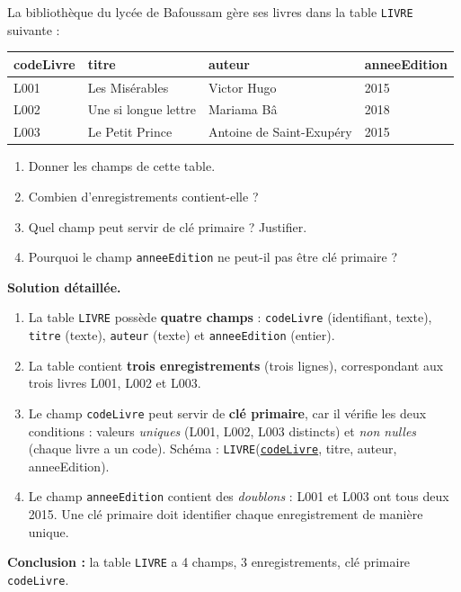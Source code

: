 \documentclass[11pt]{article}
\begin{document}
\begin{exoresolu}
La bibliothèque du lycée de Bafoussam gère ses livres dans la table \texttt{LIVRE} suivante :

\begin{center}
\begin{tabularx}{\linewidth}{|l|X|l|l|}
\hline
\rowcolor{popblueL} \textbf{codeLivre} & \textbf{titre} & \textbf{auteur} & \textbf{anneeEdition} \\
\hline
L001 & Les Misérables & Victor Hugo & 2015 \\
\hline
L002 & Une si longue lettre & Mariama Bâ & 2018 \\
\hline
L003 & Le Petit Prince & Antoine de Saint-Exupéry & 2015 \\
\hline
\end{tabularx}
\end{center}

\begin{enumerate}
\item Donner les champs de cette table.
\item Combien d'enregistrements contient-elle ?
\item Quel champ peut servir de clé primaire ? Justifier.
\item Pourquoi le champ \texttt{anneeEdition} ne peut-il pas être clé primaire ?
\end{enumerate}
\tcblower
\textbf{Solution détaillée.}
\begin{enumerate}
\item La table \texttt{LIVRE} possède \textbf{quatre champs} : \texttt{codeLivre} (identifiant, texte), \texttt{titre} (texte), \texttt{auteur} (texte) et \texttt{anneeEdition} (entier).
\item La table contient \textbf{trois enregistrements} (trois lignes), correspondant aux trois livres L001, L002 et L003.
\item Le champ \texttt{codeLivre} peut servir de \textbf{clé primaire}, car il vérifie les deux conditions : valeurs \emph{uniques} (L001, L002, L003 distincts) et \emph{non nulles} (chaque livre a un code). Schéma : \texttt{LIVRE}(\underline{\texttt{codeLivre}}, titre, auteur, anneeEdition).
\item Le champ \texttt{anneeEdition} contient des \emph{doublons} : L001 et L003 ont tous deux 2015. Une clé primaire doit identifier chaque enregistrement de manière unique.
\end{enumerate}
\textbf{Conclusion :} la table \texttt{LIVRE} a 4 champs, 3 enregistrements, clé primaire \texttt{codeLivre}.
\end{exoresolu}
\end{document}
